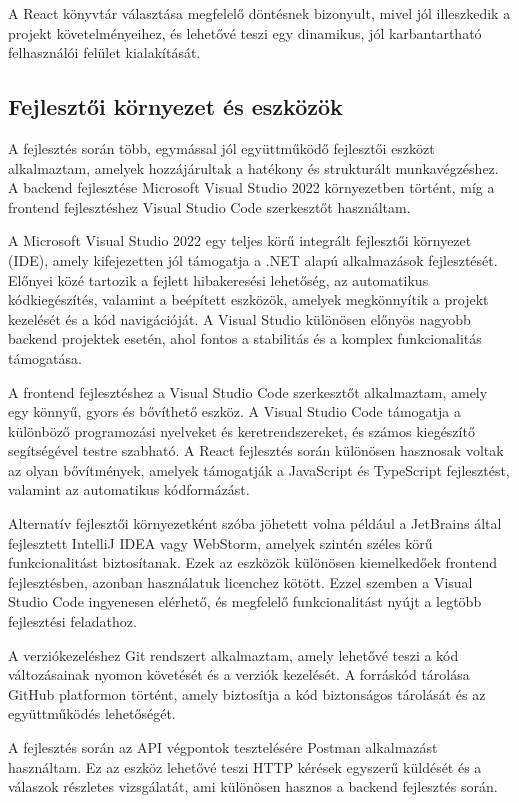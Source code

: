 \documentclass[
]{thesis-ekf}
\theoremstyle{definition}
\theoremstyle{remark}
\begin{document}
A React könyvtár választása megfelelő döntésnek bizonyult, mivel jól illeszkedik a projekt követelményeihez, és lehetővé teszi egy dinamikus, jól karbantartható felhasználói felület kialakítását.


\subsection{Fejlesztői környezet és eszközök}
A fejlesztés során több, egymással jól együttműködő fejlesztői eszközt alkalmaztam, amelyek hozzájárultak a hatékony és strukturált munkavégzéshez. A backend fejlesztése Microsoft Visual Studio 2022 környezetben történt, míg a frontend fejlesztéshez Visual Studio Code szerkesztőt használtam.

A Microsoft Visual Studio 2022 egy teljes körű integrált fejlesztői környezet (IDE), amely kifejezetten jól támogatja a .NET alapú alkalmazások fejlesztését. Előnyei közé tartozik a fejlett hibakeresési lehetőség, az automatikus kódkiegészítés, valamint a beépített eszközök, amelyek megkönnyítik a projekt kezelését és a kód navigációját. A Visual Studio különösen előnyös nagyobb backend projektek esetén, ahol fontos a stabilitás és a komplex funkcionalitás támogatása.

A frontend fejlesztéshez a Visual Studio Code szerkesztőt alkalmaztam, amely egy könnyű, gyors és bővíthető eszköz. A Visual Studio Code támogatja a különböző programozási nyelveket és keretrendszereket, és számos kiegészítő segítségével testre szabható. A React fejlesztés során különösen hasznosak voltak az olyan bővítmények, amelyek támogatják a JavaScript és TypeScript fejlesztést, valamint az automatikus kódformázást.

Alternatív fejlesztői környezetként szóba jöhetett volna például a JetBrains által fejlesztett IntelliJ IDEA vagy WebStorm, amelyek szintén széles körű funkcionalitást biztosítanak. Ezek az eszközök különösen kiemelkedőek frontend fejlesztésben, azonban használatuk licenchez kötött. Ezzel szemben a Visual Studio Code ingyenesen elérhető, és megfelelő funkcionalitást nyújt a legtöbb fejlesztési feladathoz.

A verziókezeléshez Git rendszert alkalmaztam, amely lehetővé teszi a kód változásainak nyomon követését és a verziók kezelését. A forráskód tárolása GitHub platformon történt, amely biztosítja a kód biztonságos tárolását és az együttműködés lehetőségét.

A fejlesztés során az API végpontok tesztelésére Postman alkalmazást használtam. Ez az eszköz lehetővé teszi HTTP kérések egyszerű küldését és a válaszok részletes vizsgálatát, ami különösen hasznos a backend fejlesztés során.
\end{document}
